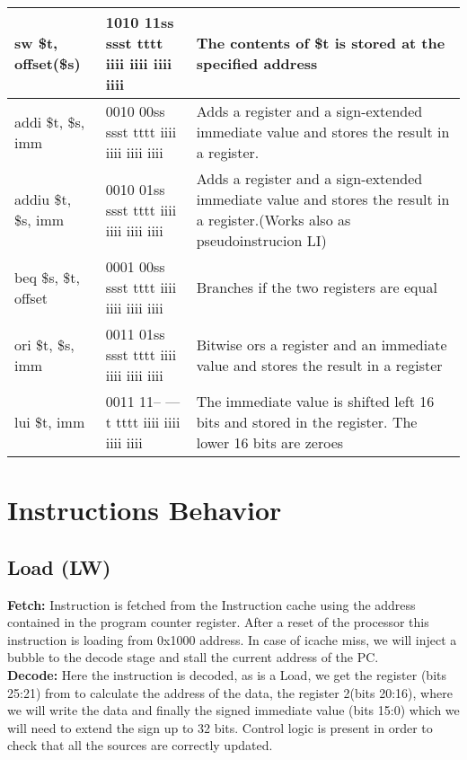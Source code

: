 \documentclass{article}
\begin{document}
\begin{landscape}
{\begin{adjustbox}{width=1.2\textwidth,center}
\begin{tabu}{|l|l|l|}
sw \$t, offset(\$s)                       & 1010 11ss ssst tttt iiii iiii iiii iiii & The contents of \$t is stored at the specified address                                                                                      \\ \hline
addi \$t, \$s, imm                        & 0010 00ss ssst tttt iiii iiii iiii iiii & Adds a register and a sign-extended immediate value and stores the result in a register.                                                    \\ \hline
addiu \$t, \$s, imm                       & 0010 01ss ssst tttt iiii iiii iiii iiii & Adds a register and a sign-extended immediate value and stores the result in a register.(Works also as pseudoinstrucion LI)                 \\ \hline
beq \$s, \$t, offset                      & 0001 00ss ssst tttt iiii iiii iiii iiii & Branches if the two registers are equal                                                                                                     \\ \hline
ori \$t, \$s, imm                         & 0011 01ss ssst tttt iiii iiii iiii iiii & Bitwise ors a register and an immediate value and stores the result in a register                                                           \\ \hline
lui \$t, imm                              & 0011 11-- ---t tttt iiii iiii iiii iiii & The immediate value is shifted left 16 bits and stored in the register. The lower 16 bits are zeroes                                        \\ \hline
\end{tabu}
\end{adjustbox}}
\end{landscape}
\section{Instructions Behavior}
\subsection{Load (LW)}
\textbf{Fetch:}
Instruction is fetched from the Instruction cache using the address contained in the program counter register. After a reset of the processor this instruction is loading from 0x1000 address. In case of icache miss, we will inject a bubble to the decode stage and stall the current address of the PC.\\

\textbf{Decode:}
Here the instruction is decoded, as is a Load, we get the register (bits 25:21) from to calculate the address of the data, the register 2(bits 20:16), where we will write the data and finally the signed immediate value (bits 15:0) which we will need to extend the sign up to 32 bits. Control logic is present in order to check that all the sources are correctly updated.\\
\end{document}

